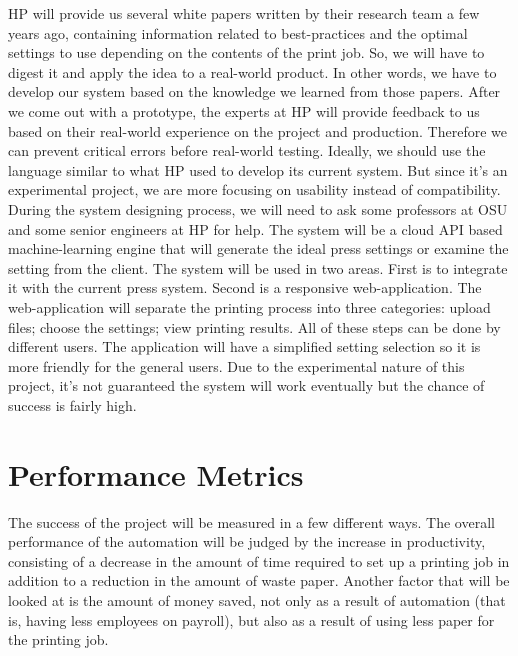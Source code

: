 \documentclass[draftclsnofoot,onecolumn,10pt]{IEEEtran}
\begin{document}
HP will provide us several white papers written by their research team a few years ago, containing information related to best-practices and the optimal settings to use depending on the contents of the print job. So, we will have to digest it and apply the idea to a real-world product. In other words, we have to develop our system based on the knowledge we learned from those papers. After we come out with a prototype, the experts at HP will provide feedback to us based on their real-world experience on the project and production. Therefore we can prevent critical errors before real-world testing. Ideally, we should use the language similar to what HP used to develop its current system. But since it’s an experimental project, we are more focusing on usability instead of compatibility.\\

During the system designing process, we will need to ask some professors at OSU and some senior engineers at HP for help. The system will be a cloud API based machine-learning engine that will generate the ideal press settings or examine the setting from the client. The system will be used in two areas. First is to integrate it with the current press system. Second is a responsive web-application. The web-application will separate the printing process into three categories: upload files; choose the settings; view printing results. All of these steps can be done by different users. The application will have a simplified setting selection so it is more friendly for the general users. Due to the experimental nature of this project, it’s not guaranteed the system will work eventually but the chance of success is fairly high.

\bigskip
\section{Performance Metrics}
The success of the project will be measured in a few different ways. The overall performance of the automation will be judged by the increase in productivity, consisting of a decrease in the amount of time required to set up a printing job in addition to a reduction in the amount of waste paper. Another factor that will be looked at is the amount of money saved, not only as a result of automation (that is, having less employees on payroll), but also as a result of using less paper for the printing job.
\end{document}

